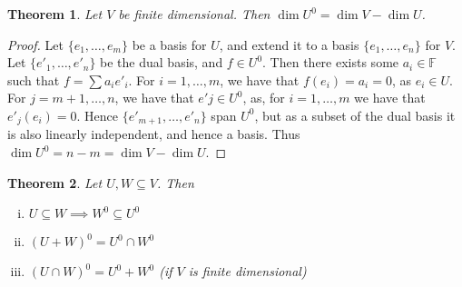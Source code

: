 \documentclass[10pt,fleqn]{article}
\newcommand{\field}{\mathbb{F}}
\theoremstyle{definition} \newtheorem{defn}{Definition}[section]
\theoremstyle{plain}      \newtheorem{thm}[defn]{Theorem}
\theoremstyle{plain}      \newtheorem{prop}[defn]{Proposition}
\theoremstyle{plain}      \newtheorem{lem}[defn]{Lemma}
\theoremstyle{plain}      \newtheorem{cor}[defn]{Corollary}
\theoremstyle{plain}      \newtheorem{ad}[defn]{Addendum}
\theoremstyle{definition} \newtheorem{ex}[defn]{Example}
\theoremstyle{definition} \newtheorem{rem}[defn]{Remark}
\numberwithin{equation}{subsection}
\begin{document}
\begin{thm}
    Let $V$ be finite dimensional.
    Then $\dim U^0=\dim V-\dim U$.
\end{thm}

\begin{proof}
    Let $\{e_1,\ldots,e_m\}$ be a basis for $U$, and extend it to a basis $\{e_1,\ldots,e_n\}$ for $V$.
    Let $\{e'_1,\ldots,e'_n\}$ be the dual basis, and $f\in U^0$.
    Then there exists some $a_i\in\field$ such that $f=\sum a_ie'_i$.
    For $i=1,\ldots,m$, we have that $f(e_i)=a_i=0$, as $e_i\in U$.
    For $j=m+1,\ldots,n$, we have that $e'j\in U^0$, as, for $i=1,\ldots,m$ we have that $e'_j(e_i)=0$.
    Hence $\{e'_{m+1},\ldots,e'_n\}$ span $U^0$, but as a subset of the dual basis it is also linearly independent, and hence a basis.
    Thus $\dim U^0=n-m=\dim V-\dim U$.
\end{proof}

\begin{thm}
    Let $U,W\subseteq V$.
    Then
    \begin{enumerate}[(i)]
        \item $U\subseteq W\implies W^0\subseteq U^0$
        \item $(U+W)^0=U^0\cap W^0$
        \item $(U\cap W)^0=U^0+W^0$ (if $V$ is finite dimensional)
    \end{enumerate}
\end{thm}
\end{document}
